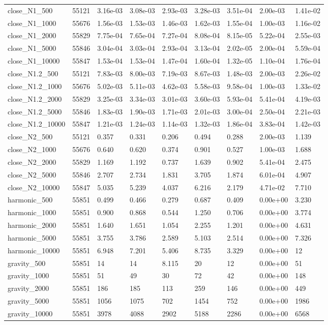 \begin{tabular}{lrlllllll}
close\_N1\_500 & 55121 & 3.16e-03 & 3.08e-03 & 2.93e-03 & 3.28e-03 & 3.51e-04 & 2.00e-03 & 1.41e-02 \\
close\_N1\_1000 & 55676 & 1.56e-03 & 1.53e-03 & 1.46e-03 & 1.62e-03 & 1.55e-04 & 1.00e-03 & 1.16e-02 \\
close\_N1\_2000 & 55829 & 7.75e-04 & 7.65e-04 & 7.27e-04 & 8.08e-04 & 8.15e-05 & 5.22e-04 & 2.55e-03 \\
close\_N1\_5000 & 55846 & 3.04e-04 & 3.03e-04 & 2.93e-04 & 3.13e-04 & 2.02e-05 & 2.00e-04 & 5.59e-04 \\
close\_N1\_10000 & 55847 & 1.53e-04 & 1.53e-04 & 1.47e-04 & 1.60e-04 & 1.32e-05 & 1.10e-04 & 1.76e-04 \\
close\_N1.2\_500 & 55121 & 7.83e-03 & 8.00e-03 & 7.19e-03 & 8.67e-03 & 1.48e-03 & 2.00e-03 & 2.26e-02 \\
close\_N1.2\_1000 & 55676 & 5.02e-03 & 5.11e-03 & 4.62e-03 & 5.58e-03 & 9.58e-04 & 1.00e-03 & 1.33e-02 \\
close\_N1.2\_2000 & 55829 & 3.25e-03 & 3.34e-03 & 3.01e-03 & 3.60e-03 & 5.93e-04 & 5.41e-04 & 4.19e-03 \\
close\_N1.2\_5000 & 55846 & 1.83e-03 & 1.90e-03 & 1.71e-03 & 2.01e-03 & 3.00e-04 & 2.50e-04 & 2.21e-03 \\
close\_N1.2\_10000 & 55847 & 1.21e-03 & 1.24e-03 & 1.14e-03 & 1.32e-03 & 1.86e-04 & 3.83e-04 & 1.42e-03 \\
close\_N2\_500 & 55121 & 0.357 & 0.331 & 0.206 & 0.494 & 0.288 & 2.00e-03 & 1.139 \\
close\_N2\_1000 & 55676 & 0.640 & 0.620 & 0.374 & 0.901 & 0.527 & 1.00e-03 & 1.688 \\
close\_N2\_2000 & 55829 & 1.169 & 1.192 & 0.737 & 1.639 & 0.902 & 5.41e-04 & 2.475 \\
close\_N2\_5000 & 55846 & 2.707 & 2.734 & 1.831 & 3.705 & 1.874 & 6.01e-04 & 4.907 \\
close\_N2\_10000 & 55847 & 5.035 & 5.239 & 4.037 & 6.216 & 2.179 & 4.71e-02 & 7.710 \\
harmonic\_500 & 55851 & 0.499 & 0.466 & 0.279 & 0.687 & 0.409 & 0.00e+00 & 3.230 \\
harmonic\_1000 & 55851 & 0.900 & 0.868 & 0.544 & 1.250 & 0.706 & 0.00e+00 & 3.774 \\
harmonic\_2000 & 55851 & 1.640 & 1.651 & 1.054 & 2.255 & 1.201 & 0.00e+00 & 4.631 \\
harmonic\_5000 & 55851 & 3.755 & 3.786 & 2.589 & 5.103 & 2.514 & 0.00e+00 & 7.326 \\
harmonic\_10000 & 55851 & 6.948 & 7.201 & 5.406 & 8.735 & 3.329 & 0.00e+00 & 12 \\
gravity\_500 & 55851 & 14 & 14 & 8.115 & 20 & 12 & 0.00e+00 & 51 \\
gravity\_1000 & 55851 & 51 & 49 & 30 & 72 & 42 & 0.00e+00 & 148 \\
gravity\_2000 & 55851 & 186 & 185 & 113 & 259 & 146 & 0.00e+00 & 449 \\
gravity\_5000 & 55851 & 1056 & 1075 & 702 & 1454 & 752 & 0.00e+00 & 1986 \\
gravity\_10000 & 55851 & 3978 & 4088 & 2902 & 5188 & 2286 & 0.00e+00 & 6568 \\
\bottomrule
\end{tabular}
